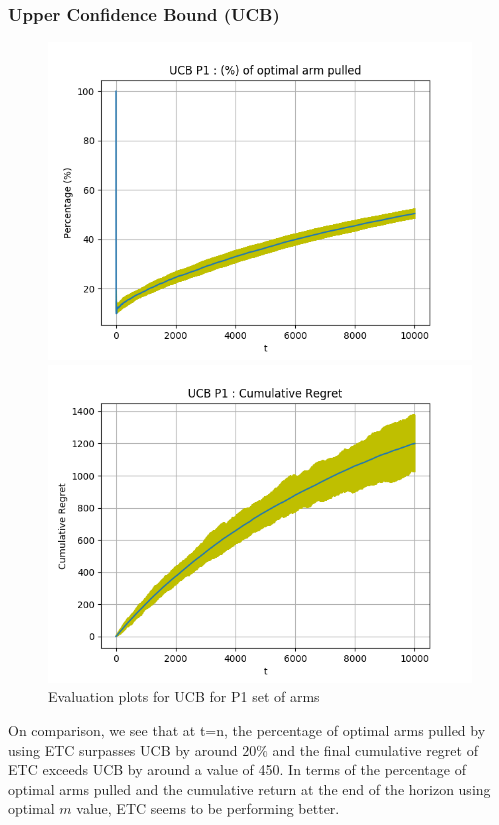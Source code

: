 \documentclass[12pt]{report}
\begin{document}
		\subsubsection{Upper Confidence Bound (UCB)}
			\begin{figure}[H]
				\begin{multicols}{2}
					\includegraphics[scale=0.5]{Figures/UCB_P1_op.png} \par
					\includegraphics[scale=0.5]{Figures/UCB_P1_ret.png}
				\end{multicols}
				\caption{Evaluation plots for UCB for P1 set of arms}
				\label{Fig2}
			\end{figure}

	\noindent On comparison, we see that at t=n, the percentage of optimal arms pulled by using ETC surpasses UCB by around $20\%$	and the final cumulative regret of ETC exceeds UCB by around a value of 450. In terms of the percentage of optimal arms pulled and the cumulative return at the end of the horizon using optimal $m$ value, ETC seems to be performing better.
	
\end{document}
